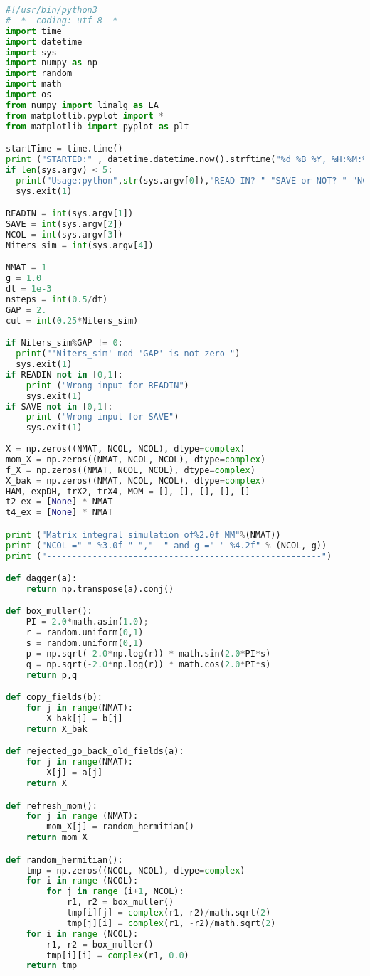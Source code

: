 \begin{lstlisting}[language=Python]
#!/usr/bin/python3
# -*- coding: utf-8 -*-
import time 
import datetime 
import sys
import numpy as np
import random
import math
import os 
from numpy import linalg as LA
from matplotlib.pyplot import *
from matplotlib import pyplot as plt

startTime = time.time()
print ("STARTED:" , datetime.datetime.now().strftime("%d %B %Y, %H:%M:%S"))
if len(sys.argv) < 5:
  print("Usage:python",str(sys.argv[0]),"READ-IN? " "SAVE-or-NOT? " "NCOL " "NITERS")
  sys.exit(1)

READIN = int(sys.argv[1])
SAVE = int(sys.argv[2])
NCOL = int(sys.argv[3]) 
Niters_sim = int(sys.argv[4])

NMAT = 1
g = 1.0
dt = 1e-3
nsteps = int(0.5/dt) 
GAP = 2.
cut = int(0.25*Niters_sim) 

if Niters_sim%GAP != 0:
  print("'Niters_sim' mod 'GAP' is not zero ")
  sys.exit(1) 
if READIN not in [0,1]:
    print ("Wrong input for READIN")
    sys.exit(1)
if SAVE not in [0,1]:
    print ("Wrong input for SAVE")
    sys.exit(1)
  
X = np.zeros((NMAT, NCOL, NCOL), dtype=complex)
mom_X = np.zeros((NMAT, NCOL, NCOL), dtype=complex)
f_X = np.zeros((NMAT, NCOL, NCOL), dtype=complex)
X_bak = np.zeros((NMAT, NCOL, NCOL), dtype=complex)
HAM, expDH, trX2, trX4, MOM = [], [], [], [], []
t2_ex = [None] * NMAT
t4_ex = [None] * NMAT

print ("Matrix integral simulation of%2.0f MM"%(NMAT)) 
print ("NCOL =" " %3.0f " ","  " and g =" " %4.2f" % (NCOL, g)) 
print ("------------------------------------------------------")

def dagger(a):
	return np.transpose(a).conj()

def box_muller():  
	PI = 2.0*math.asin(1.0);    
	r = random.uniform(0,1)
	s = random.uniform(0,1)
	p = np.sqrt(-2.0*np.log(r)) * math.sin(2.0*PI*s)
	q = np.sqrt(-2.0*np.log(r)) * math.cos(2.0*PI*s)
	return p,q

def copy_fields(b):
	for j in range(NMAT):
		X_bak[j] = b[j]
	return X_bak

def rejected_go_back_old_fields(a):
	for j in range(NMAT):
		X[j] = a[j]
	return X

def refresh_mom():
	for j in range (NMAT):
		mom_X[j] = random_hermitian()
	return mom_X

def random_hermitian():
	tmp = np.zeros((NCOL, NCOL), dtype=complex)
	for i in range (NCOL):
		for j in range (i+1, NCOL):
			r1, r2 = box_muller()
			tmp[i][j] = complex(r1, r2)/math.sqrt(2)
			tmp[j][i] = complex(r1, -r2)/math.sqrt(2)
	for i in range (NCOL):
		r1, r2 = box_muller()
		tmp[i][i] = complex(r1, 0.0) 
	return tmp


\end{lstlisting}
